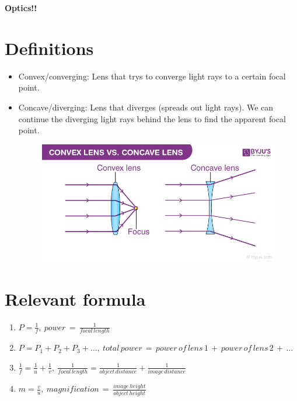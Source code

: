 \documentclass[12pt]{article}
\begin{document}
    {\Huge \textbf{Optics!!} \par}

    \section*{Definitions}
    \begin{itemize}
        \item Convex/converging: Lens that trys to converge light rays to a certain focal point.
        
        \item Concave/diverging: Lens that diverges (spreads out light rays). We can continue the
        diverging light rays behind the lens to find the apparent focal point.
        
        \begin{figure}[h]
            \includegraphics[width = \linewidth]{Convex-lens-1.png}
        \end{figure}
    \end{itemize}

    \section*{Relevant formula}
    \begin{enumerate}
        \item $P = \frac{1}{f}, \: power \, = \, \frac{1}{focal \, length}$
        \item $P = P_{1} + P_{2} + P_{3} + \ldots, \: total \, power \, = \, power \, of \, 
        lens \, 1 \,+\, power \, of \, lens \, 2 \, +\, \ldots$
        \item $\frac{1}{f} = \frac{1}{u} + \frac{1}{v}, \: \frac{1}{focal \, length} = 
        \frac{1}{object \, distance} + \frac{1}{image \, distance}$
        \item $m = \frac{v}{u}, \: magnification \, = \, \frac{image \, height}{object \, height}$
    \end{enumerate}
\end{document}
